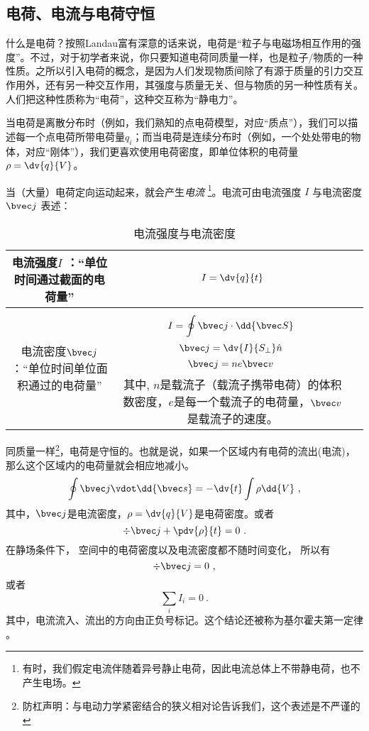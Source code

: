 
\begin{issues}
\issueDraft
\end{issues}

\subsection{电荷、电流与电荷守恒}
什么是电荷？按照Landau富有深意的话来说，电荷是“粒子与电磁场相互作用的强度”。不过，对于初学者来说，你只要知道电荷同质量一样，也是粒子/物质的一种性质。之所以引入电荷的概念，是因为人们发现物质间除了有源于质量的引力交互作用外，还有另一种交互作用，其强度与质量无关、但与物质的另一种性质有关。人们把这种性质称为“电荷”，这种交互称为“静电力”。

当电荷是离散分布时（例如，我们熟知的点电荷模型，对应“质点”），我们可以描述每一个点电荷所带电荷量$q_i$；而当电荷是连续分布时（例如，一个处处带电的物体，对应“刚体”），我们更喜欢使用电荷密度，即单位体积的电荷量$\rho = \dv{q}{V}$。

当（大量）电荷定向运动起来，就会产生\textsl{电流} \footnote{有时，我们假定电流伴随着异号静止电荷，因此电流总体上不带静电荷，也不产生电场。}。电流可由电流强度 $I$ 与电流密度 $\bvec j$ 表述：

\begin{table}[ht]
\centering
\caption{电流强度与电流密度}\label{tab_estfid3}
\begin{tabular}{|c|c|c|}
\hline
电流强度$I$ ：“单位时间通过截面的电荷量” & $I = \dv{q}{t}$ \\
\hline
电流密度$\bvec j$ ：“单位时间单位面积通过的电荷量” & $$I = \oint \bvec j \cdot \dd {\bvec S}~$$ $$\bvec j= \dv{I}{S_\perp} \hat n~$$ $$\bvec j = n e \bvec v~$$其中, $n$是载流子（载流子携带电荷）的体积数密度，$e$是每一个载流子的电荷量，$\bvec v$是载流子的速度。 \\
\hline
\end{tabular}
\end{table}


同质量一样\footnote{防杠声明：与电动力学紧密结合的狭义相对论告诉我们，这个表述是不严谨的}，电荷是守恒的。也就是说，如果一个区域内有电荷的流出(电流)，那么这个区域内的电荷量就会相应地减小。
$$
\oint \bvec j \vdot \dd{\bvec s}  =  - \dv{t} \int \rho \dd{V}~,
$$
其中，$\bvec j$是电流密度，$\rho = \dv{q}{V}$是电荷密度。或者
$$
\div \bvec j + \pdv{\rho}{t} = 0~.
$$
在静场条件下， 空间中的电荷密度以及电流密度都不随时间变化， 所以有
$$
\div \bvec j = 0~,
$$
或者
$$\sum_i I_i = 0~.$$
其中，电流流入、流出的方向由正负号标记。这个结论还被称为基尔霍夫第一定律 。

